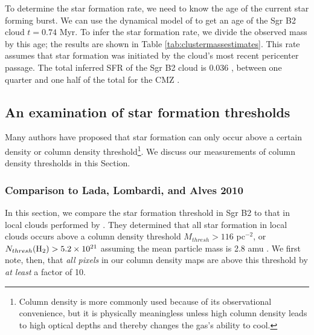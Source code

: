 \documentclass[twocolumn]{aastex61}
\begin{document}
To determine the star formation rate, we need to know the age of the current
star forming burst.  We can use the dynamical model of \citet{Kruijssen2015a}
to get an age of the Sgr B2 cloud $t=0.74$ Myr.  To infer the star formation
rate, we divide the observed mass by this age; the results are shown in
Table \ref{tab:clustermassestimates}.  This rate assumes that star formation was
initiated by the cloud's most recent pericenter passage.  The total inferred
SFR of the Sgr B2 cloud is 0.036 \msun \permyr, between one quarter and one
half of the total for the CMZ \citep{Longmore2013a,Barnes2017b}.


% 

\subsection{An examination of star formation thresholds}
Many authors \citep[e.g.,][]{Lada2010a} have proposed that star formation can
only occur above a certain density or column density threshold\footnote{Column
density is more commonly used because of its observational convenience, but it
is physically meaningless unless high column density leads to high optical
depths and thereby changes the gas's ability to cool.}. 
We discuss our measurements of column density thresholds in this Section.



\subsubsection{Comparison to Lada, Lombardi, and Alves 2010}
In this section, we compare the star formation threshold in Sgr B2 to that in
local clouds performed by \citet{Lada2010a}.  They determined that all star
formation in local clouds occurs above a column density threshold $M_{thresh} >
116$ \msun pc$^{-2}$, or $N_{thresh}(\textrm{H}_{2}) > 5.2\times10^{21}$ \persc assuming the
mean particle mass is 2.8 amu \citep{Kauffmann2008a}.  We first note, then,
that \emph{all pixels} in our column density maps are above this threshold
by \emph{at least} a factor of 10.
\end{document}

